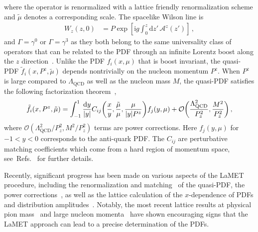 \documentclass[11pt,a4paper]{article}
\DeclareRobustCommand{\mycites}[1]{Refs.~\cite{#1}}
\newcommand{\df}{\mathrm{d}}
\newcommand{\img}{\mathrm{i}}
\newcommand{\cA}{\mathcal{A}}
\newcommand{\LQCD}{\Lambda_\mathrm{QCD}}
\begin{document}
where the operator is renormalized with a lattice friendly renormalization scheme and $\tilde\mu$ denotes a corresponding scale.
The spacelike Wilson line is
\begin{align}
W_z(z,0) &= P \exp\left[ \img g \int^z_0 \df z'\, \cA^z(z') \right]
\,,\end{align}
and $\Gamma=\gamma^0$ or $\Gamma=\gamma^3$ as they both belong to the same universality class of operators that can be related to the PDF through an infinite Lorentz boost along the $z$ direction~\cite{Hatta:2013gta}. Unlike the PDF $f_i(x,\mu)$ that is boost invariant, the quasi-PDF $\tilde{f}_i(x,P^z,\tilde\mu)$ depends nontrivially on the nucleon momentum $P^z$. When $P^z$ is large compared to $\LQCD$ as well as the nucleon mass $M$, the quasi-PDF satisfies the following factorization theorem~\cite{Ji:2013dva,Ji:2014gla,Ma:2014jla,Ma:2017pxb,Izubuchi:2018srq},
\begin{align}\label{eq:fimatch}
 \tilde{f}_i(x,P^z,\tilde\mu) = \int_{-1}^1 \frac{\df y}{|y|}
  C_{ij}\biggl(\frac{x}{y}, \frac{\tilde\mu}{\mu}, \frac{\mu}{|y| P^z} \biggr) f_j(y,\mu)
  + \mathcal{O}\biggl({\LQCD^2\over P_z^2}, {M^2\over P_z^2} \biggr)
\,,\end{align}
where $\mathcal{O}(\LQCD^2/P_z^2,M^2/P_z^2)$ terms are power corrections. Here $f_j(y,\mu)$ for $-1<y<0$ corresponds to the anti-quark PDF.  
The  $C_{ij}$ are perturbative matching coefficients which come from a hard region of momentum space, see~\mycites      {Ma:2014jla,Izubuchi:2018srq} for further details.

Recently, significant progress has been made on various aspects of the LaMET procedure, including the renormalization and matching~\cite{Xiong:2013bka,Ma:2014jla,Ma:2014jga,Ji:2015jwa,Ji:2015qla,Xiong:2015nua,Li:2016amo,Ishikawa:2016znu,Chen:2016fxx,Carlson:2017gpk,Briceno:2017cpo,Xiong:2017jtn,Constantinou:2017sej,Rossi:2017muf,Ji:2017rah,Ji:2017oey,Ishikawa:2017faj,Green:2017xeu,Wang:2017qyg,Chen:2017mie,Stewart:2017tvs,Wang:2017eel,Spanoudes:2018zya,Izubuchi:2018srq,Xu:2018mpf,Rossi:2018zkn,Zhang:2018diq,Li:2018tpe,Liu:2018tox} of the quasi-PDF, the power corrections~\cite{Chen:2016utp,Radyushkin:2017ffo,Braun:2018brg}, as well as the lattice calculation of the $x$-dependence of PDFs and distribution amplitudes~\cite{Lin:2014zya,Alexandrou:2015rja,Chen:2016utp,Alexandrou:2016jqi,Zhang:2017bzy,Alexandrou:2017huk,Chen:2017mzz,Green:2017xeu,Chen:2017lnm,Chen:2017gck,Alexandrou:2018pbm,Chen:2018xof,Chen:2018fwa,Alexandrou:2018eet,Liu:2018uuj,Lin:2018qky,Fan:2018dxu,Liu:2018hxv}. Notably, the most recent lattice results at physical pion mass~\cite{Alexandrou:2018pbm,Chen:2018xof,Alexandrou:2018eet,Lin:2018qky,Liu:2018hxv} and large nucleon momenta~\cite{Chen:2018xof,Lin:2018qky,Liu:2018hxv} have shown encouraging signs that the LaMET approach can lead to a precise determination of the PDFs.
\end{document}
